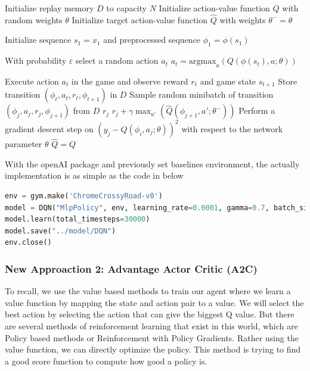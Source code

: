 \documentclass{article}
\begin{document}
\begin{algorithm}[H]
    \caption{DQN with experience replay}
    Initialize replay memory $D$ to capacity $N$ \;
    Initialize action-value function $Q$ with random weights $\theta$\;
    Initialize target action-value function $\hat{Q}$ with weights $\theta^{-} = \theta$\;
    {
        Initialize sequence $s_1 = {x_1}$ and preprocessed sequence $\phi_1 = \phi(s_1)$\;
        {
            {
                With probability $\varepsilon$ select a random action $a_t$\;
            } \Else
            {
                $a_t = \text{argmax}_a(Q(\phi(s_t), a; \theta))$\;
            }

            Execute action $a_t$ in the game and observe reward $r_t$ and game state $s_{t+1}$\;
            Store transition $(\phi_t, a_t, r_t, \phi_{t + 1})$ in $D$\;
            Sample random minibatch of transition $(\phi_j, a_j, r_j, \phi_{j + 1})$ from $D$\;
            {
                $r_j$\;
            } \Else 
            {
                $r_j + \gamma \max_{a'}(\hat{Q}(\phi_{j + 1}, a'; \theta^-))$
            }
            Perform a gradient descent step on $(y_j - Q(\phi_{i}, a_j; \theta))^2$ with respect to the network parameter $\theta$\;
            $\hat{Q} = Q$\;
        }
    }
\end{algorithm}

With the openAI package and previously set baselines environment, the actually implementation is as simple as the code in below
\begin{lstlisting}[language = Python]
env = gym.make('ChromeCrossyRoad-v0')
model = DQN("MlpPolicy", env, learning_rate=0.0001, gamma=0.7, batch_size=1024, prioritized_replay=True, verbose=1, tensorboard_log="./log/dqn_crossy_road_tensorboard/")
model.learn(total_timesteps=30000)
model.save("../model/DQN")
env.close()
\end{lstlisting}

\subsubsection{New Approaction 2: Advantage Actor Critic (A2C)}

To recall, we use the value based methods to train our agent where we learn a value function by mapping the state and action pair to a value. We will select the best action by selecting the action that can give the biggest Q value. But there are several methods of reinforcement learning that exist in this world, which are Policy based methods or  Reinforcement with Policy Gradients. Rather using the value function, we can directly optimize the policy. This method is trying to find a good score function to compute how good a policy is. \par 
\end{document}
